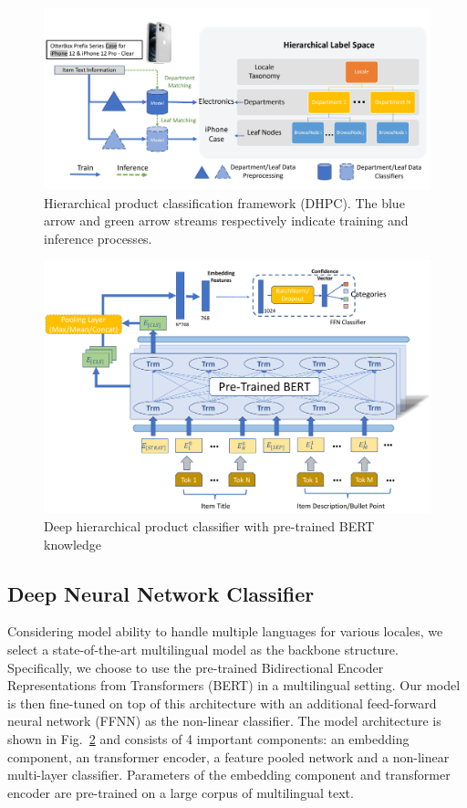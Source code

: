 \documentclass[11pt,dvipsnames]{article}
\begin{document}
\begin{figure}[h]
\center
        \includegraphics[width=0.9\linewidth]{submissions/bert_pt/figures/Pipeline_general.pdf}
    \caption{Hierarchical product classification framework (DHPC). The blue arrow and green arrow streams respectively indicate training and inference processes.}
    \label{fig:pipeline}
\end{figure}

\begin{figure}[h]
\center
        \includegraphics[width=0.8\linewidth]{submissions/bert_pt/figures/Model_structure.pdf}
    \caption{Deep hierarchical product classifier with pre-trained BERT knowledge}
    \label{fig:bertmodel}
\end{figure}





\subsection{Deep Neural Network Classifier}
Considering model ability to handle multiple languages for various locales, we select a state-of-the-art multilingual model as the backbone structure. Specifically, we choose to use the pre-trained Bidirectional Encoder Representations from Transformers (BERT) in a multilingual setting. Our model is then fine-tuned on top of this architecture with an additional feed-forward neural network (FFNN) as the non-linear classifier. The model architecture is shown in Fig.~\ref{fig:bertmodel} and consists of 4 important components: an embedding component, an transformer encoder, a feature pooled network and a non-linear multi-layer classifier. Parameters of the embedding component and transformer encoder are pre-trained on a large corpus of multilingual text.
\end{document}
